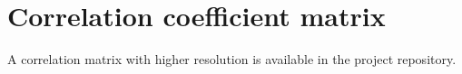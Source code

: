 \documentclass[\main/main.tex]{subfiles}
\begin{document}
\section{Correlation coefficient matrix}
A correlation matrix with higher resolution is available in the project repository.
\begin{center}
\end{center}
\end{document}

